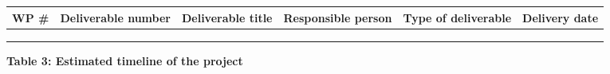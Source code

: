 \documentclass[a4paper,11pt]{nprp}
\begin{document}
\begin{center}
\setlength{\realwidth}{\dimexpr \textwidth - 12\tabcolsep - 7\arrayrulewidth}
\begin{tabular}{|M{0.1\realwidth}|M{0.19\realwidth}|M{0.19\realwidth}|M{0.17\realwidth}|M{0.25\realwidth}|M{0.10\realwidth}|}
\hline
  \textbf{WP \#} &
  \textbf{Deliverable number} &
  \textbf{Deliverable title} &
  \textbf{Responsible person} &
  \textbf{Type of deliverable} &
  \textbf{Delivery date} \\
\hline
   &  &  &  &  &  \\
\hline
   &  &  &  &  &  \\
\hline
   &  &  &  &  &  \\
\hline
\end{tabular}
\end{center}


\uselandscape

\noindent
\textbf{Table 3: Estimated timeline of the project}
\vspace{1cm}

\newcommand{\w}{\cellcolor{wpcolor}}
\newcommand{\s}{\cellcolor{taskcolor}}
\newcommand{\rb}[1]{\textbf{{\color{red}#1}}}
\end{document}
